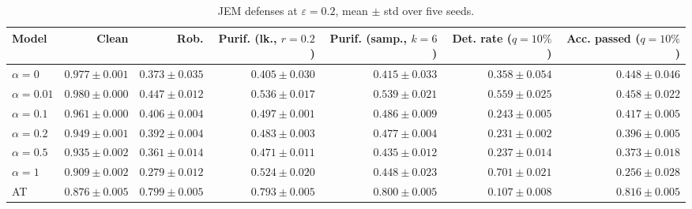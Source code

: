 \begin{table}[htbp]
\centering
\small
\begin{tabular}{@{}lrrrrrr@{}}
\toprule
Model & Clean & Rob. & Purif. (lk., $r=0.2$) & Purif. (samp., $k=6$) & Det. rate ($q=10\%$) & Acc. passed ($q=10\%$) \\
\midrule
$\alpha{=}0$ & $0.977 \pm 0.001$ & $0.373 \pm 0.035$ & $0.405 \pm 0.030$ & $0.415 \pm 0.033$ & $0.358 \pm 0.054$ & $0.448 \pm 0.046$ \\
$\alpha{=}0.01$ & $\mathbf{0.980 \pm 0.000}$ & $0.447 \pm 0.012$ & $0.536 \pm 0.017$ & $0.539 \pm 0.021$ & $0.559 \pm 0.025$ & $0.458 \pm 0.022$ \\
$\alpha{=}0.1$ & $0.961 \pm 0.000$ & $0.406 \pm 0.004$ & $0.497 \pm 0.001$ & $0.486 \pm 0.009$ & $0.243 \pm 0.005$ & $0.417 \pm 0.005$ \\
$\alpha{=}0.2$ & $0.949 \pm 0.001$ & $0.392 \pm 0.004$ & $0.483 \pm 0.003$ & $0.477 \pm 0.004$ & $0.231 \pm 0.002$ & $0.396 \pm 0.005$ \\
$\alpha{=}0.5$ & $0.935 \pm 0.002$ & $0.361 \pm 0.014$ & $0.471 \pm 0.011$ & $0.435 \pm 0.012$ & $0.237 \pm 0.014$ & $0.373 \pm 0.018$ \\
$\alpha{=}1$ & $0.909 \pm 0.002$ & $0.279 \pm 0.012$ & $0.524 \pm 0.020$ & $0.448 \pm 0.023$ & $\mathbf{0.701 \pm 0.021}$ & $0.256 \pm 0.028$ \\
AT & $0.876 \pm 0.005$ & $\mathbf{0.799 \pm 0.005}$ & $\mathbf{0.793 \pm 0.005}$ & $\mathbf{0.800 \pm 0.005}$ & $0.107 \pm 0.008$ & $\mathbf{0.816 \pm 0.005}$ \\
\bottomrule
\end{tabular}
\caption{JEM defenses at $\varepsilon=0.2$, mean $\pm$ std over five seeds.}
\label{tab:jem_mnist_r12_models}
\end{table}
